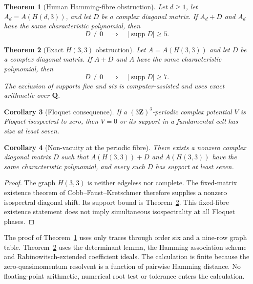 \documentclass[11pt,reqno]{amsart}
\newtheorem{theorem}{Theorem}[section]
\newtheorem{corollary}[theorem]{Corollary}
\theoremstyle{definition}
\theoremstyle{remark}
\DeclareMathOperator{\supp}{supp}
\newcommand{\Q}{\mathbf Q}
\newcommand{\Z}{\mathbf Z}
\begin{document}
\begin{theorem}[Human Hamming-fibre obstruction]\label{thm:human}
Let $d\geq1$, let $A_d=A(H(d,3))$, and let $D$ be a complex diagonal
matrix.  If
$A_d+D$ and $A_d$ have the same characteristic polynomial, then
\[
 D\neq0\quad\Longrightarrow\quad
 |\supp D|\geq5.
\]
\end{theorem}

\begin{theorem}[Exact $H(3,3)$ obstruction]\label{thm:computer}
Let $A=A(H(3,3))$ and let $D$ be a complex diagonal matrix.  If $A+D$ and
$A$ have the same characteristic polynomial, then
\[
 D\neq0\quad\Longrightarrow\quad
 \boxed{|\supp D|\geq7}.
\]
The exclusion of supports five and six is computer-assisted and uses exact
arithmetic over $\Q$.
\end{theorem}

\begin{corollary}[Floquet consequence]\label{cor:floquet}
If a $(3\Z)^3$-periodic complex potential $V$ is Floquet isospectral to
zero, then $V=0$ or its support in a fundamental cell has size at least
seven.
\end{corollary}

\begin{corollary}[Non-vacuity at the periodic fibre]\label{cor:nonvacuity}
There exists a nonzero complex diagonal matrix $D$ such that $A(H(3,3))+D$
and $A(H(3,3))$ have the same characteristic polynomial, and every such
$D$ has support at least seven.
\end{corollary}

\begin{proof}
The graph $H(3,3)$ is neither edgeless nor complete.  The fixed-matrix
existence theorem of Cobb--Faust--Kretschmer
\cite[Corollary~B]{cobb2026} therefore supplies a nonzero isospectral
diagonal shift.  Its support bound is Theorem~\ref{thm:computer}.  This
fixed-fibre existence statement does not imply simultaneous isospectrality
at all Floquet phases.
\end{proof}

The proof of Theorem~\ref{thm:human} uses only traces through order six and a
nine-row graph table.  Theorem~\ref{thm:computer} uses the determinant lemma,
the Hamming association scheme and Rabinowitsch-extended coefficient ideals.  The
calculation is finite because the zero-quasimomentum resolvent is a function
of pairwise Hamming distance.  No floating-point arithmetic, numerical root
test or tolerance enters the calculation.
\end{document}
